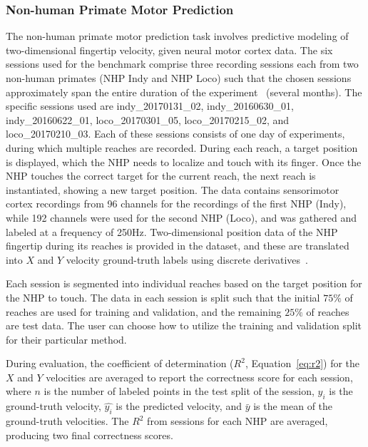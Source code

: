 \subsubsection*{Non-human Primate Motor Prediction}
The non-human primate motor prediction task involves predictive modeling of two-dimensional fingertip velocity, given neural motor cortex data.
The six sessions used for the benchmark comprise three recording sessions each from two non-human primates (NHP Indy and NHP Loco) such that the chosen sessions approximately span the entire duration of the experiment~\cite{makin-dataset} (several months).
The specific sessions used are indy\_20170131\_02, indy\_20160630\_01, indy\_20160622\_01, loco\_20170301\_05, loco\_20170215\_02, and loco\_20170210\_03.
Each of these sessions consists of one day of experiments, during which multiple reaches are recorded. During each reach, a target position is displayed, which the NHP needs to localize and touch with its finger. Once the NHP touches the correct target for the current reach, the next reach is instantiated, showing a new target position. The data contains sensorimotor cortex recordings from 96 channels for the recordings of the first NHP (Indy), while 192 channels were used for the second NHP (Loco), and was gathered and labeled at a frequency of 250Hz. Two-dimensional position data of the NHP fingertip during its reaches is provided in the dataset, and these are translated into $X$ and $Y$ velocity ground-truth labels using discrete derivatives~\cite{makin-paper}.

Each session is segmented into individual reaches based on the target position for the NHP to touch. 
The data in each session is split such that the initial $75\%$ of reaches are used for training and validation, and the remaining $25\%$ of reaches are test data. The user can choose how to utilize the training and validation split for their particular method.  

During evaluation, the coefficient of determination ($R^2$, Equation~\ref{eq:r2}) for the $X$ and $Y$ velocities are averaged to report the correctness score for each session, where $n$ is the number of labeled points in the test split of the session, $y_i$ is the ground-truth velocity, $\hat{y_i}$ is the predicted velocity, and $\bar{y}$ is the mean of the ground-truth velocities. The $R^2$ from sessions for each NHP are averaged, producing two final correctness scores.

